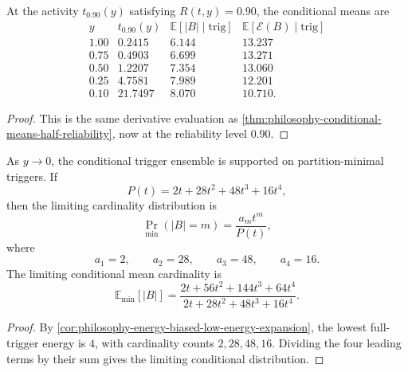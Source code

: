 \begin{theorem}
\label{thm:philosophy-conditional-means-high-reliability}
At the activity $t_{0.90}(y)$ satisfying $R(t,y)=0.90$, the conditional
means are
$$
\begin{array}{c|r|r|r}
  y & t_{0.90}(y) & \mathbb{E}[|B|\mid\mathrm{trig}] &
  \mathbb{E}[\mathcal{E}(B)\mid\mathrm{trig}]\\
  \hline
  1.00 & 0.2415 & 6.144 & 13.237\\
  0.75 & 0.4903 & 6.699 & 13.271\\
  0.50 & 1.2207 & 7.354 & 13.060\\
  0.25 & 4.7581 & 7.989 & 12.201\\
  0.10 & 21.7497 & 8.070 & 10.710.
\end{array}
$$
\end{theorem}
\begin{proof}
This is the same derivative evaluation as
\autoref{thm:philosophy-conditional-means-half-reliability}, now at
the reliability level $0.90$.
\end{proof}

\begin{theorem}
\label{thm:philosophy-low-energy-conditional-distribution}
As $y\to0$, the conditional trigger ensemble is supported on
partition-minimal triggers. If
$$
  P(t)=2t+28t^{2}+48t^{3}+16t^{4},
$$
then the limiting cardinality distribution is
$$
  \Pr_{\min}(|B|=m)=\frac{a_{m}t^{m}}{P(t)},
$$
where
$$
  a_{1}=2,\qquad
  a_{2}=28,\qquad
  a_{3}=48,\qquad
  a_{4}=16.
$$
The limiting conditional mean cardinality is
$$
  \mathbb{E}_{\min}[|B|]
  =
  \frac{
  2t+56t^{2}+144t^{3}+64t^{4}
  }{
  2t+28t^{2}+48t^{3}+16t^{4}
  }.
$$
\end{theorem}
\begin{proof}
By \autoref{cor:philosophy-energy-biased-low-energy-expansion}, the
lowest full-trigger energy is $4$, with cardinality counts
$2,28,48,16$. Dividing the four leading terms by their sum gives the
limiting conditional distribution.
\end{proof}

